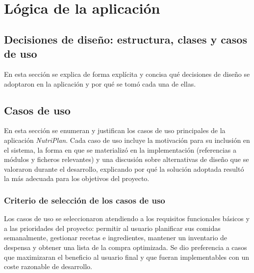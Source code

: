 \documentclass[twoside, openright, 11pt]{report}
\begin{document}
	
	\section{Lógica de la aplicación}
		\subsection{Decisiones de diseño: estructura, clases y casos de uso}
		En esta sección se explica de forma explícita y concisa qué decisiones de diseño se adoptaron en la aplicación y por qué se tomó cada una de ellas.
		

		\subsection{Casos de uso}
		\label{sec:casos_de_uso}
		
		En esta sección se enumeran y justifican los casos de uso principales de la aplicación \textit{NutriPlan}. Cada caso de uso incluye la motivación para su inclusión en el sistema, la forma en que se materializó en la implementación (referencias a módulos y ficheros relevantes) y una discusión sobre alternativas de diseño que se valoraron durante el desarrollo, explicando por qué la solución adoptada resultó la más adecuada para los objetivos del proyecto.
		
		\subsubsection*{Criterio de selección de los casos de uso}
		Los casos de uso se seleccionaron atendiendo a los requisitos funcionales básicos y a las prioridades del proyecto: permitir al usuario planificar sus comidas semanalmente, gestionar recetas e ingredientes, mantener un inventario de despensa y obtener una lista de la compra optimizada. Se dio preferencia a casos que maximizaran el beneficio al usuario final y que fueran implementables con un coste razonable de desarrollo.
		
\end{document}
